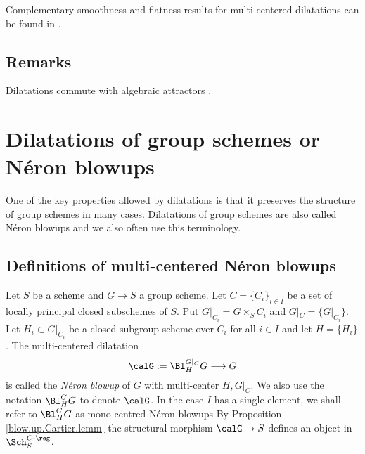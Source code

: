 \documentclass[10pt]{alggeom}
\theoremstyle{definition}
\numberwithin{equation}{section}
\begin{document}
\rema Complementary smoothness and flatness results for multi-centered dilatations can be found in \cite[§6]{Ma23d}.
\xrema

\subsection{Remarks}

Dilatations commute with algebraic attractors \cite[Proposition 13.1]{Ma23a}.


\section{Dilatations of group schemes or Néron blowups} \label{neron} 
One of the key properties allowed by dilatations is that it preserves the structure of group schemes in many cases. Dilatations of group schemes are also called N\'eron blowups and we also often use this terminology.

\subsection{Definitions of multi-centered Néron blowups} \label{subnermulti}
Let $S$ be a scheme and $G\to S$ a group scheme.
Let $C=\{C_i\}_{i\in I} $ be a set of locally principal closed subschemes of $S$.  Put  $ G|_{C_i} = G \times _S C_i$ and ${G}|_C= \{ G|_{C_i} \}$.
Let $H_i\subset G|_{C_i}$ be a closed subgroup scheme over $C_i$ for all $i \in I$ and let $H= \{H_i \}$. The multi-centered dilatation 
\[
\calG:=\Bl_H^{{G}|_C}G\longrightarrow G\] is called the {\it N\'eron blowup} of $G$ with multi-center $H,{G}|_C$. We also use the notation $\Bl_H^{C}G$ to denote $\calG$.  
In the case $I$ has a single element, we shall refer to $\Bl_H^{C}G$ as mono-centred N\'eron blowups
By Proposition \ref{blow.up.Cartier.lemm} the structural morphism $\calG\to S$
defines an object in $\Sch_S^{C\text{-}\reg}$.
\end{document}
